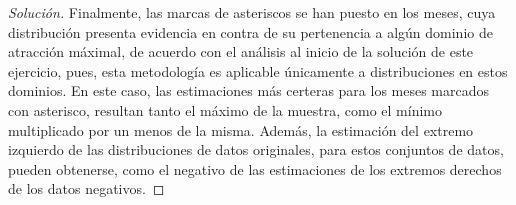 \documentclass[10.5pt,notitlepage]{article}
\newenvironment{solucion}
  {\begin{proof}[Solución]}
  {\end{proof}}
\theoremstyle{plain}
\begin{document}
\begin{solucion}
\begin{table}[H]
        \centering
        \caption{Datos de temperaturas máximas en Albania por mes, durante los años \(1900\) a \(2021\).}
        \label{tab:3}
\end{table}
Finalmente, las marcas de asteriscos se han puesto en los meses, cuya distribución presenta evidencia en contra de su pertenencia a algún dominio de atracción máximal, de acuerdo con el análisis al inicio de la solución de este ejercicio, pues, esta metodología es aplicable únicamente a distribuciones en estos dominios. En este caso, las estimaciones más certeras para los meses marcados con asterisco, resultan tanto el máximo de la muestra, como el mínimo multiplicado por un menos de la misma. Además, la estimación del extremo izquierdo de las distribuciones de datos originales, para estos conjuntos de datos, pueden obtenerse, como el negativo de las estimaciones de los extremos derechos de los datos negativos.
\end{solucion}
\end{document}
